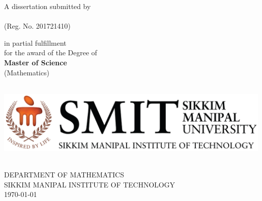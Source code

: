 
\begin{titlepage}
\begin{center}\sf \Large
{\Huge\textbf{\thesistitle}}

\vfill
{\baselineskip=25pt
A dissertation submitted by\\

{\bf  \authorname}\\

(Reg. No. 201721410)

\vspace{20pt}
in partial fulfillment\\
for the award of the Degree of \\

{\bf Master of Science}\\

(Mathematics)
\vfill

\includegraphics[height=4cm]{smit.eps}





DEPARTMENT OF MATHEMATICS\\
SIKKIM MANIPAL INSTITUTE OF TECHNOLOGY\\
\today}
\end{center}
\end{titlepage}
